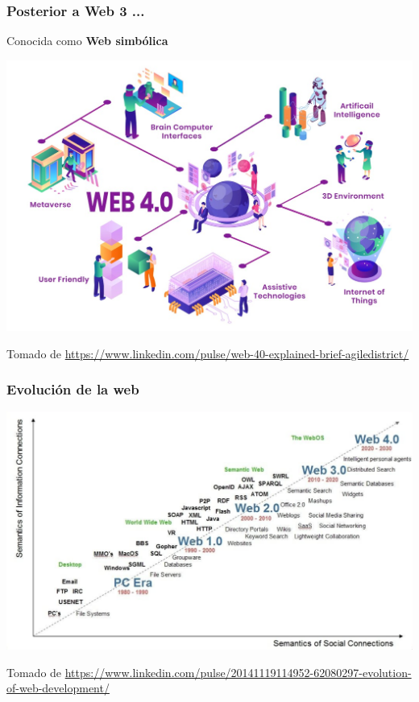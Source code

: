\documentclass[
10pt, %
aspectratio=169, %
]{beamer}
\begin{document}
	\begin{frame}
		
		\frametitle{Posterior a Web 3 ...}
		
		
		\centering
		
		Conocida como \textbf{Web simbólica}
		
		\includegraphics[scale=0.25]{web_4.jpeg} 
		
		{\scriptsize Tomado de \url{https://www.linkedin.com/pulse/web-40-explained-brief-agiledistrict/}}
		
	\end{frame}
	
	\begin{frame}
		
		\frametitle{Evolución de la web}
		
		\centering
		\includegraphics[scale=0.33]{evolucion.png} 
		
		{\scriptsize Tomado de \url{https://www.linkedin.com/pulse/20141119114952-62080297-evolution-of-web-development/}}
		
	\end{frame}
	
\end{document}

